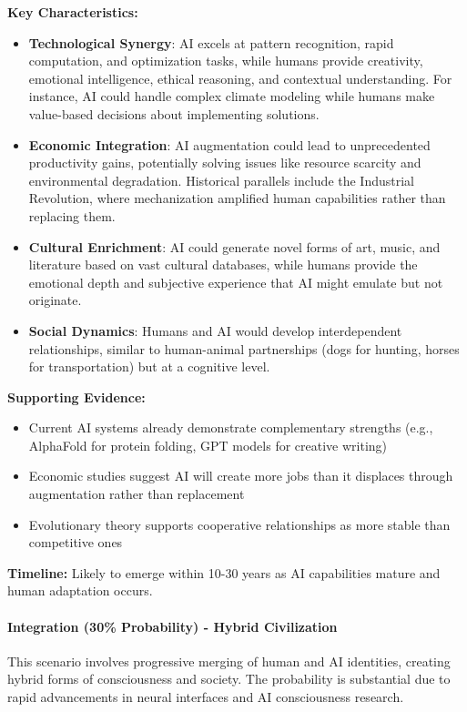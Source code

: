 \documentclass[12pt,a4paper]{article}
\begin{document}
\textbf{Key Characteristics:}
\begin{itemize}
    \item \textbf{Technological Synergy}: AI excels at pattern recognition, rapid computation, and optimization tasks, while humans provide creativity, emotional intelligence, ethical reasoning, and contextual understanding. For instance, AI could handle complex climate modeling while humans make value-based decisions about implementing solutions.
    \item \textbf{Economic Integration}: AI augmentation could lead to unprecedented productivity gains, potentially solving issues like resource scarcity and environmental degradation. Historical parallels include the Industrial Revolution, where mechanization amplified human capabilities rather than replacing them.
    \item \textbf{Cultural Enrichment}: AI could generate novel forms of art, music, and literature based on vast cultural databases, while humans provide the emotional depth and subjective experience that AI might emulate but not originate.
    \item \textbf{Social Dynamics}: Humans and AI would develop interdependent relationships, similar to human-animal partnerships (dogs for hunting, horses for transportation) but at a cognitive level.
\end{itemize}

\textbf{Supporting Evidence:}
\begin{itemize}
    \item Current AI systems already demonstrate complementary strengths (e.g., AlphaFold for protein folding, GPT models for creative writing)
    \item Economic studies suggest AI will create more jobs than it displaces through augmentation rather than replacement
    \item Evolutionary theory supports cooperative relationships as more stable than competitive ones
\end{itemize}

\textbf{Timeline:} Likely to emerge within 10-30 years as AI capabilities mature and human adaptation occurs.

\paragraph{Integration (30\% Probability) - Hybrid Civilization}

This scenario involves progressive merging of human and AI identities, creating hybrid forms of consciousness and society. The probability is substantial due to rapid advancements in neural interfaces and AI consciousness research.
\end{document}
